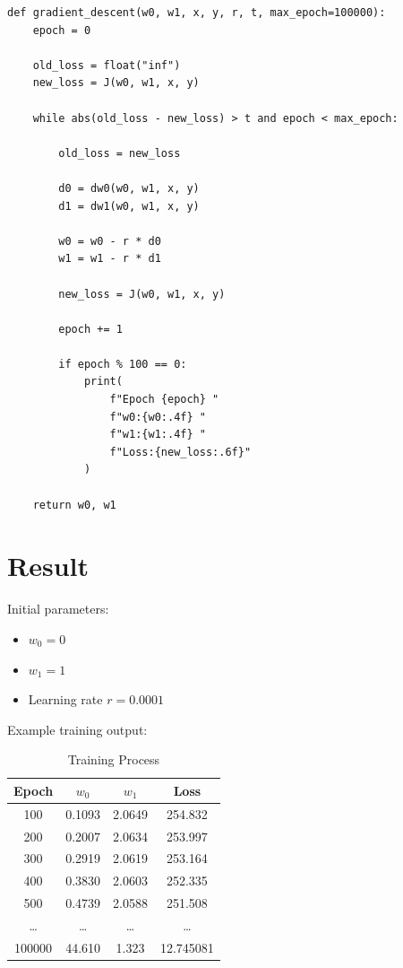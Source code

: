 \documentclass{article}
\begin{document}
\begin{lstlisting}
def gradient_descent(w0, w1, x, y, r, t, max_epoch=100000):
    epoch = 0

    old_loss = float("inf")
    new_loss = J(w0, w1, x, y)

    while abs(old_loss - new_loss) > t and epoch < max_epoch:

        old_loss = new_loss

        d0 = dw0(w0, w1, x, y)
        d1 = dw1(w0, w1, x, y)

        w0 = w0 - r * d0
        w1 = w1 - r * d1

        new_loss = J(w0, w1, x, y)

        epoch += 1

        if epoch % 100 == 0:
            print(
                f"Epoch {epoch} "
                f"w0:{w0:.4f} "
                f"w1:{w1:.4f} "
                f"Loss:{new_loss:.6f}"
            )

    return w0, w1
\end{lstlisting}

\section{Result}

Initial parameters:

\begin{itemize}
    \item $w_0 = 0$
    \item $w_1 = 1$
    \item Learning rate $r = 0.0001$
\end{itemize}

Example training output:

\begin{table}[h!]
\centering
\caption{Training Process}
\begin{tabular}{|c|c|c|c|}
\hline
Epoch & $w_0$ & $w_1$ & Loss \\ \hline
100 & 0.1093 & 2.0649 & 254.832 \\ \hline
200 & 0.2007 & 2.0634 & 253.997 \\ \hline
300 & 0.2919 & 2.0619 & 253.164 \\ \hline
400 & 0.3830 & 2.0603 & 252.335 \\ \hline
500 & 0.4739 & 2.0588 & 251.508 \\ \hline
\dots & \dots & \dots & \dots \\ \hline
100000 & 44.610 & 1.323 & 12.745081 \\ \hline
\end{tabular}
\end{table}
\end{document}
